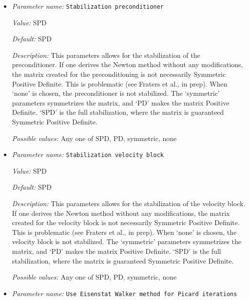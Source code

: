 \begin{itemize}
{\it Possible values:} A floating point number $v$ such that $0 \leq v \leq 1$
\item {\it Parameter name:} {\tt Stabilization preconditioner}
\label{parameters:Solver parameters/Newton solver parameters/Stabilization preconditioner}
\label{parameters:Solver_20parameters/Newton_20solver_20parameters/Stabilization_20preconditioner}


{\it Value:} SPD


{\it Default:} SPD


{\it Description:} This parameters allows for the stabilization of the preconditioner. If one derives the Newton method without any modifications, the matrix created for the preconditioning is not necessarily Symmetric Positive Definite. This is problematic (see Fraters et al., in prep). When `none' is chosen, the preconditioner is not stabilized. The `symmetric' parameters symmetrizes the matrix, and `PD' makes the matrix Positive Definite. `SPD' is the full stabilization, where the matrix is guaranteed Symmetric Positive Definite.


{\it Possible values:} Any one of SPD, PD, symmetric, none
\item {\it Parameter name:} {\tt Stabilization velocity block}
\label{parameters:Solver parameters/Newton solver parameters/Stabilization velocity block}
\label{parameters:Solver_20parameters/Newton_20solver_20parameters/Stabilization_20velocity_20block}


{\it Value:} SPD


{\it Default:} SPD


{\it Description:} This parameters allows for the stabilization of the velocity block. If one derives the Newton method without any modifications, the matrix created for the velocity block is not necessarily Symmetric Positive Definite. This is problematic (see Fraters et al., in prep). When `none' is chosen, the velocity block is not stabilized. The `symmetric' parameters symmetrizes the matrix, and `PD' makes the matrix Positive Definite. `SPD' is the full stabilization, where the matrix is guaranteed Symmetric Positive Definite.


{\it Possible values:} Any one of SPD, PD, symmetric, none
\item {\it Parameter name:} {\tt Use Eisenstat Walker method for Picard iterations}
\label{parameters:Solver parameters/Newton solver parameters/Use Eisenstat Walker method for Picard iterations}
\label{parameters:Solver_20parameters/Newton_20solver_20parameters/Use_20Eisenstat_20Walker_20method_20for_20Picard_20iterations}



\end{itemize}
